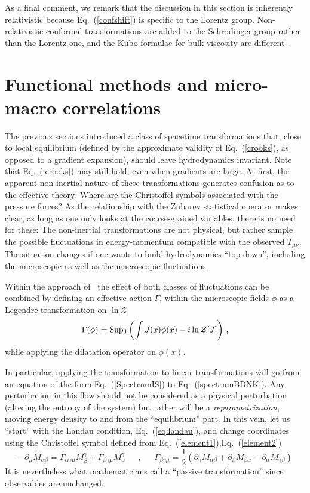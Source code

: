 \documentclass[12pt,onecolumn,showpacs,amssymb,aps,nofootinbib,floatfix]{revtex4-2}
\renewcommand{\eqref}[1]{Eq.~(\ref{#1})}
\newcommand{\eqcomma}{\phantom{AA},\phantom{AA}}
\newcommand{\lnz}{\ln \mathcal{Z}}
\begin{document}
	As a final comment, we remark that the discussion in this section is inherently relativistic because \eqref{confshift} is specific to the Lorentz group.   Non-relativistic conformal transformations are added to the Schrodinger group rather than the Lorentz one, and the Kubo formulae for bulk viscosity are different~\cite{sonconf}.
	\section{Functional methods and micro-macro correlations} \label{functional}
	The previous sections introduced a class of spacetime transformations that, close to local equilibrium (defined by the approximate validity of \eqref{crooks}, as opposed to a gradient expansion), should leave hydrodynamics invariant. Note that \eqref{crooks} may still hold, even when gradients are large. At first, the apparent non-inertial nature of these transformations generates confusion as to the effective theory: Where are the Christoffel symbols associated with the pressure forces?   As the relationship with the Zubarev statistical operator makes clear, as long as one only looks at the coarse-grained variables, there is no need for these:  The non-inertial transformations are not physical, but rather sample the possible fluctuations in energy-momentum compatible with the observed $T_{\mu \nu}$.   The situation changes if one wants to build hydrodynamics ``top-down'', including the microscopic as well as the macroscopic fluctuations.
	
	Within the approach of~\cite{grossi} the effect of both classes of fluctuations can be combined by defining an effective action $\Gamma$, within the microscopic fields $\phi$ as a Legendre transformation on $\lnz$
	\begin{equation}
		\Gamma(\phi)={\rm Sup_J}\left( \int J(x)\phi(x)- i \lnz[J] \right)\,,
	\end{equation}
	while applying the dilatation operator on $\phi(x)$.
	
	In particular, applying the transformation to linear transformations will
	go from an equation of the form  \eqref{SpectrumIS} to
	\eqref{spectrumBDNK}.   Any perturbation in this flow should not be considered as a physical perturbation (altering the entropy of the system) but rather will be a {\em reparametrization}, moving energy density to and from the ``equilibrium'' part.
	In this vein, let us ``start'' with the Landau condition, \eqref{eq:landau}, and change coordinates using the Christoffel symbol defined from \eqref{element1},\eqref{element2}
	\begin{equation}
		\label{liegroup}
		- \partial_\mu M_{\alpha \beta}  = \Gamma_{\alpha \gamma \mu} M^{\gamma}_{\beta} + \Gamma_{\beta \gamma \mu} M^{\gamma}_{\alpha} \eqcomma \Gamma_{\beta \gamma \mu}=\frac{1}{2} \left( \partial_\gamma M_{\alpha \beta}+\partial_\beta M_{\beta \alpha }-\partial_\alpha M_{ \gamma \beta} \right)
	\end{equation}
	It is nevertheless what mathematicians call a ``passive transformation'' since observables are unchanged.
	
\end{document}
